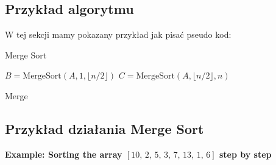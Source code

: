 \documentclass[11pt,a4paper]{article}
\begin{document}
\subsection{Przykład algorytmu}
W tej sekcji mamy pokazany przykład jak pisać pseudo kod:
\begin{algorithm}[H]
    \caption{Merge Sort}\label{alg:merge_sort}
    \begin{algorithmic}[1]
            \State {}
        \Else
            \State $B = \text{MergeSort}(A, 1, \lfloor n/2 \rfloor)$
            \State $C = \text{MergeSort}(A, \lfloor n/2 \rfloor, n)$
            \State {}
        \EndIf
    \EndProcedure
    \end{algorithmic}
\end{algorithm}
\begin{algorithm}[H]
    \caption{Merge}\label{alg:merge}
    \begin{algorithmic}[1]
            \State {}
            \State {}
            \State {}
        \Else
            \State {}
        \EndIf
    \EndProcedure
    \end{algorithmic}
\end{algorithm}
\subsection{Przykład działania Merge Sort}
\textbf{Example: Sorting the array \([10,\, 2,\, 5,\, 3,\, 7,\, 13,\, 1,\, 6]\) step by step}
\end{document}
